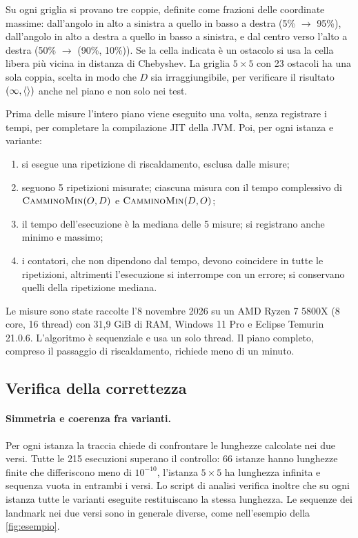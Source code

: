 Su ogni griglia si provano tre coppie, definite come frazioni delle
coordinate massime: dall'angolo in alto a sinistra a quello in basso a destra
(5\% $\to$ 95\%), dall'angolo in alto a destra a quello in basso a sinistra,
e dal centro verso l'alto a destra (50\% $\to$ (90\%, 10\%)). Se la cella
indicata è un ostacolo si usa la cella libera più vicina in distanza di
Chebyshev. La griglia $5\times5$ con 23 ostacoli ha una sola coppia, scelta
in modo che $D$ sia irraggiungibile, per verificare il risultato
$(\infty, \langle  \rangle)$ anche nel piano e non solo nei test.

Prima delle misure l'intero piano viene eseguito una volta, senza
registrare i tempi, per completare la compilazione JIT della JVM. Poi, per
ogni istanza e variante:

\begin{enumerate}
  \item si esegue una ripetizione di riscaldamento, esclusa dalle misure;
  \item seguono 5 ripetizioni misurate; ciascuna misura con
         il tempo complessivo di
        $\textsc{CamminoMin}(O,D)$ e $\textsc{CamminoMin}(D,O)$;
  \item il tempo dell'esecuzione è la mediana delle 5 misure; si registrano
        anche minimo e massimo;
  \item i contatori, che non dipendono dal tempo, devono coincidere in tutte
        le ripetizioni, altrimenti l'esecuzione si interrompe con un errore;
        si conservano quelli della ripetizione mediana.
\end{enumerate}

Le misure sono state raccolte l'8 novembre 2026 su un AMD Ryzen 7 5800X (8
core, 16 thread) con 31,9 GiB di RAM, Windows 11 Pro e Eclipse Temurin
21.0.6. L'algoritmo è sequenziale e usa un solo thread. Il piano completo,
compreso il passaggio di riscaldamento, richiede meno di un minuto.

\subsection{Verifica della correttezza}
\label{sec:verifica-cmin}

\paragraph{Simmetria e coerenza fra varianti.} Per ogni istanza la traccia
chiede di confrontare le lunghezze calcolate nei due versi. Tutte le 215
esecuzioni superano il controllo: 66 istanze hanno lunghezze finite che
differiscono meno di $10^{-10}$, l'istanza $5\times5$ ha lunghezza infinita
e sequenza vuota in entrambi i versi. Lo script di analisi verifica inoltre
che su ogni istanza tutte le varianti eseguite restituiscano la stessa
lunghezza. Le sequenze dei landmark nei due versi sono in generale diverse,
come nell'esempio della \cref{fig:esempio}.

